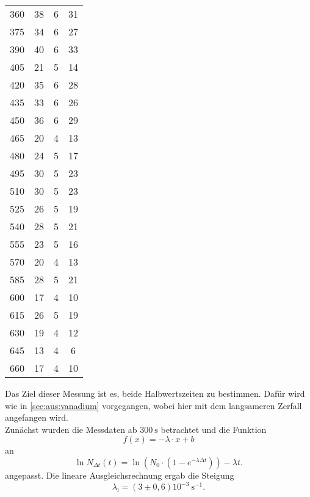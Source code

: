 \begin{longtable}{c c c c}
		360  	&  38  	&  6         	&  31 \\
		375  	&  34  	&  6         	&  27 \\
		390  	&  40  	&  6         	&  33 \\
		405  	&  21  	&  5         	&  14 \\
		420  	&  35  	&  6         	&  28 \\
		435  	&  33  	&  6         	&  26 \\
		450  	&  36  	&  6         	&  29 \\
		465  	&  20  	&  4         	&  13 \\
		480  	&  24  	&  5         	&  17 \\
		495  	&  30  	&  5         	&  23 \\
		510  	&  30  	&  5         	&  23 \\
		525  	&  26  	&  5         	&  19 \\
		540  	&  28  	&  5         	&  21 \\
		555  	&  23  	&  5         	&  16 \\
		570  	&  20  	&  4         	&  13 \\
		585  	&  28  	&  5         	&  21 \\
		600  	&  17  	&  4         	&  10 \\
		615  	&  26  	&  5         	&  19 \\
		630  	&  19  	&  4         	&  12 \\
		645  	&  13  	&  4         	&   6 \\
		660  	&  17  	&  4         	&  10 \\
\end{longtable}
\noindent
Das Ziel dieser Messung ist es, beide Halbwertszeiten zu bestimmen. Dafür wird wie in \autoref{sec:aus:vanadium}
vorgegangen, wobei hier mit dem langsameren Zerfall angefangen wird.
\\
Zunächst wurden die Messdaten ab $\SI{300}{\second}$ betrachtet und die Funktion
\begin{equation}
	f(x) = -\lambda \cdot x + b
	\label{eqn:mx+b2}
\end{equation}
\noindent
an 
\begin{equation}
	\ln N_{\Delta t}(t) = \ln(N_0 \cdot (1 - e^{-\lambda \Delta t})) - \lambda t.
	\label{eqn:logarithmisch2}
\end{equation}
angepasst.
Die lineare Ausgleichsrechnung ergab die Steigung
\begin{equation}
	\lambda_\text{l} = (3 \pm 0,6) 10^{-3}\ \si{\second}^{-1}.
\end{equation}
